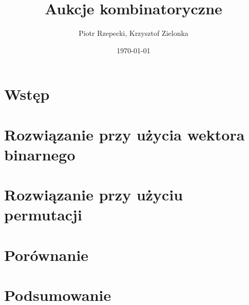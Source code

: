 \documentclass{article}
\title{Aukcje kombinatoryczne}
\author{Piotr Rzepecki, Krzysztof Zielonka}
\date{\today}
\begin{document}
\maketitle

\section{Wstęp}


\section{Rozwiązanie przy użycia wektora binarnego}


\section{Rozwiązanie przy użyciu permutacji}


\section{Porównanie}

\section{Podsumowanie}
\end{document}
